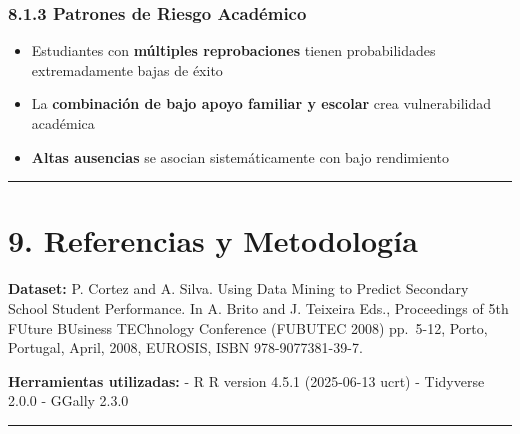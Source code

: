 \documentclass[
]{book}
\providecommand{\tightlist}{%
  \setlength{\itemsep}{0pt}\setlength{\parskip}{0pt}}
\begin{document}
\subsubsection{8.1.3 Patrones de Riesgo Académico}\label{patrones-de-riesgo-acaduxe9mico}

\begin{itemize}
\tightlist
\item
  Estudiantes con \textbf{múltiples reprobaciones} tienen probabilidades extremadamente bajas de éxito
\item
  La \textbf{combinación de bajo apoyo familiar y escolar} crea vulnerabilidad académica
\item
  \textbf{Altas ausencias} se asocian sistemáticamente con bajo rendimiento
\end{itemize}

\begin{center}\rule{0.5\linewidth}{0.5pt}\end{center}

\section{9. Referencias y Metodología}\label{referencias-y-metodologuxeda}

\textbf{Dataset:} P. Cortez and A. Silva. Using Data Mining to Predict Secondary School Student Performance. In A. Brito and J. Teixeira Eds., Proceedings of 5th FUture BUsiness TEChnology Conference (FUBUTEC 2008) pp.~5-12, Porto, Portugal, April, 2008, EUROSIS, ISBN 978-9077381-39-7.

\textbf{Herramientas utilizadas:}
- R R version 4.5.1 (2025-06-13 ucrt)
- Tidyverse 2.0.0
- GGally 2.3.0

\begin{center}\rule{0.5\linewidth}{0.5pt}\end{center}
\end{document}
